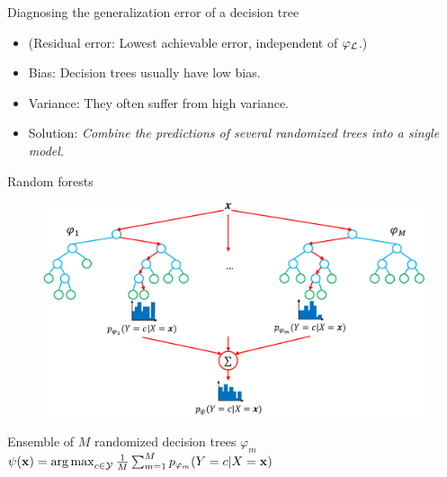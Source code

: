\documentclass{beamer}
\DeclareMathOperator*{\argmax}{arg\,max}
\begin{document}
\begin{frame}{Diagnosing the generalization error of a decision tree}

\begin{itemize}
\item (Residual error: Lowest achievable error, independent of $\varphi_{\cal L}$.)
\item Bias: Decision trees usually have {\color{blue} low bias}.
\item Variance: They often suffer from {\color{red} high variance}.
\end{itemize}

\begin{itemize}
\item Solution: {\it Combine the predictions of several randomized trees into a single model.}
\end{itemize}

\end{frame}



\begin{frame}{Random forests}
\begin{figure}
    \includegraphics[scale=0.5]{./figures/forest.pdf}
\end{figure}

Ensemble of $M$ randomized decision trees $\varphi_m$\\
$\psi(\mathbf{x}) = \argmax_{c \in {\cal Y}} \frac{1}{M} \sum_{m=1}^M p_{\varphi_m}(Y = c | X = \mathbf{x})$
\end{frame}
\end{document}
